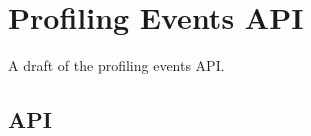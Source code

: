\documentclass[oneside]{book}
\begin{document}
\section{Profiling Events API}\label{sec:profevents}
A draft of the profiling events API.

\subsection{API}


%



\appendix
\end{document}
